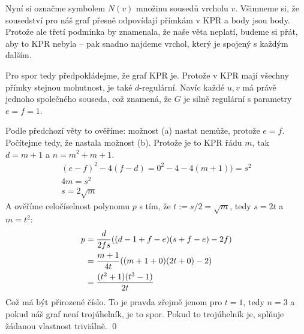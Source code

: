 Nyní si označme symbolem $N(v)$ množinu sousedů vrcholu $v$. Všimneme si, že
sousedství pro náš graf přesně odpovídají přímkám v KPR a body jsou body. Protože ale třetí
podmínka by znamenala, že naše věta neplatí, budeme si přát, aby to KPR nebyla
-- pak snadno najdeme vrchol, který je spojený s každým dalším.

Pro spor tedy předpokládejme, že graf KPR je. Protože v KPR mají všechny přímky stejnou mohutnost, je také $d$-regulární. Navíc každé $u,v$ má právě jednoho společného souseda, což znamená, že $G$ je silně regulární s parametry  $e=f=1$.

Podle předchozí věty to ověříme: možnost (a) nastat nemůže, protože $e=f$.
Počítejme tedy, že nastala možnost (b). Protože je to KPR řádu $m$, tak $d=m+1$ a $n=m^2 + m + 1$.
\begin{align}
	(e-f)^2 - 4(f-d) = 0^2 - 4 - 4(m+1))= s^2 \\
	4m = s^2 \\
	s=2\sqrt m 
\end{align}
A ověříme celočíselnost polynomu $p$ s tím, že $t:=s/2=\sqrt m$, tedy $s=2t$ a $m=t^2$:
\begin{align}
	p &= {d \over 2fs} ((d-1+f-e)(s+f-e)-2f) \\
	&= {m+1 \over 4t} ((m+1+0)(2t+0)-2)\\
	&= {(t^2 + 1)(t^3-1) \over 2t}
\end{align}
Což má být přirozené číslo. To je pravda zřejmě jenom pro $t=1$, tedy $n=3$ a pokud náš graf není trojúhelník, je to spor. Pokud to trojúhelník je, splňuje žádanou vlastnost triviálně. \qed


